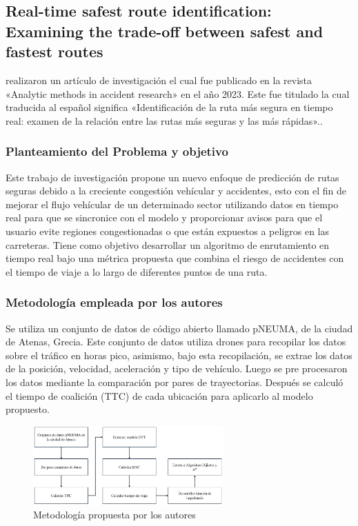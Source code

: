 \subsection{Real-time safest route identification: Examining the trade-off between safest and fastest routes \citep*{pr_Ghoul}}
\citeauthor{pr_Ghoul} realizaron un artículo de investigación el cual fue publicado en la revista «Analytic methods in accident research» en el año 2023. Este fue titulado  la cual traducida al español significa «Identificación de la ruta más segura en tiempo real: examen de la relación entre las rutas más seguras y las más rápidas»..

\subsubsection{Planteamiento del Problema y objetivo }
Este trabajo de investigación propone un nuevo enfoque de predicción de rutas seguras debido a la creciente congestión vehícular y accidentes, esto con el fin de mejorar el flujo vehícular  de un determinado sector utilizando datos en tiempo real para que se sincronice con el modelo y proporcionar avisos para que el usuario evite regiones congestionadas o que están expuestos a peligros en las carreteras. Tiene como objetivo desarrollar un algoritmo de enrutamiento en tiempo real bajo una métrica propuesta que combina el riesgo de accidentes con el tiempo de viaje a lo largo de diferentes puntos de una ruta.

\subsubsection{Metodología empleada por los autores}
Se utiliza un conjunto de datos de código abierto llamado pNEUMA, de la ciudad de Atenas, Grecia. Este conjunto de datos utiliza drones para recopilar los datos sobre el tráfico en horas pico, asimismo, bajo esta recopilación, se extrae los datos de la posición, velocidad, aceleración y tipo de vehículo. Luego se pre procesaron los datos mediante la comparación por pares de trayectorias. Después se calculó el tiempo de coalición (TTC) de cada ubicación para aplicarlo al modelo propuesto.
\begin{figure}[h]
	\begin{center}
		\includegraphics[width=0.65\textwidth]{2/figures/AtenaMetodo.jpg}
		\caption{Metodología propuesta por los autores}
		\label{1:fig2}
	\end{center}
\end{figure}

